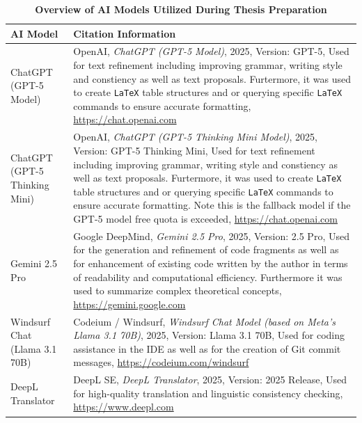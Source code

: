 \documentclass[12pt,a4paper]{article}
\begin{document}
\captionsetup{list=no} %
\begin{table}[H]
    \centering
    \begin{threeparttable}
        \caption{\textbf{Overview of AI Models Utilized During Thesis Preparation}}
        \label{list_of_ai_tools}
        \small
        \begin{tabular}{p{4cm} p{12cm}}
            \toprule
            \textbf{AI Model}                                                 & \textbf{Citation Information} \\
            \midrule
            ChatGPT (GPT-5 Model)                                             &
            OpenAI, \textit{ChatGPT (GPT-5 Model)}, 2025, Version: GPT-5, Used for text refinement including improving grammar, writing style and constiency as well as text proposals. Furtermore, it was used to create \texttt{LaTeX} table structures and or querying specific \texttt{LaTeX} commands to ensure accurate formatting, \url{https://chat.openai.com} \\

            ChatGPT (GPT-5 Thinking Mini)                                     &
            OpenAI, \textit{ChatGPT (GPT-5 Thinking Mini Model)}, 2025, Version: GPT-5 Thinking Mini, Used for text refinement including improving grammar, writing style and constiency as well as text proposals. Furtermore, it was used to create \texttt{LaTeX} table structures and or querying specific \texttt{LaTeX} commands to ensure accurate formatting. Note this is the fallback model if the GPT-5 model free quota is exceeded, \url{https://chat.openai.com} \\

            Gemini 2.5 Pro                                                    &
            Google DeepMind, \textit{Gemini 2.5 Pro}, 2025, Version: 2.5 Pro, Used for the generation and refinement of code fragments as well as for enhancement of existing code written by the author in terms of readability and computational efficiency. Furthermore it was used to summarize complex theoretical concepts, \url{https://gemini.google.com} \\

            Windsurf Chat (Llama 3.1 70B)                                     &
            Codeium / Windsurf, \textit{Windsurf Chat Model (based on Meta’s Llama 3.1 70B)}, 2025, Version: Llama 3.1 70B, Used for coding assistance in the IDE as well as for the creation of Git commit messages, \url{https://codeium.com/windsurf} \\

            DeepL Translator                                                  &
            DeepL SE, \textit{DeepL Translator}, 2025, Version: 2025 Release, Used for high-quality translation and linguistic consistency checking, \url{https://www.deepl.com} \\
            \bottomrule
        \end{tabular}
    \end{threeparttable}
\end{table}
\end{document}

